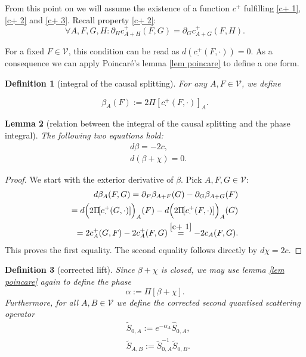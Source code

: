 \documentclass[b5paper,draft,openbib,12pt]{memoir}
\newtheorem{Def}{Definition}
\newtheorem{Lemma}[Def]{Lemma}
\begin{document}
From this point on we will assume the existence of  a function \(c^+\) fulfilling \eqref{c+ 1},\eqref{c+ 2} and \eqref{c+ 3}.
Recall property \eqref{c+ 2}: 
\begin{equation}
\forall A,F,G,H: \partial_H c_{A+H}^+(F,G)=\partial_G c^+_{A+G}(F,H).
\end{equation}

For a fixed \(F\in\mathcal{V}\), this condition can be 
read as \(d( c^+_{\cdot} (F,\cdot))=0\). As a 
consequence we can apply Poincaré's lemma 
\ref{lem poincare} to define a one form.

\begin{Def}[integral of the causal splitting]
For any \(A,F\in\mathcal{V}\), we define

\begin{equation}\label{eq: def beta}
\beta_A(F):=2 \Pi\![c^+_{\cdot}(F,\cdot)]_A.
\end{equation}
\end{Def}

\begin{Lemma}[relation between the integral of the causal splitting and the phase integral]
The following two equations hold:
\begin{align}\label{beta c}
&d \beta=-2 c,\\
&d(\beta +\chi)=0.
\end{align}
\end{Lemma}
\begin{proof}
We start with the exterior derivative of \(\beta\). Pick \(A,F,G\in\mathcal{V}\):
\begin{align}
d\beta_A(F,G)=\partial_F \beta_{A+F}(G)-\partial_G \beta_{A+G}(F)\\
=d\Big(2\Pi\![c^+_\cdot(G,\cdot)]\Big)_A(F)-d\Big(2\Pi\![c^+_\cdot(F,\cdot)]\Big)_A(G)\\
=2 c^+_A(G,F)-2 c_A^+(F,G)\overset{\eqref{c+ 1}}{=}-2 c_A(F,G).
\end{align}
This proves the first equality. The second equality follows directly by \(d \chi=2 c\).
\end{proof}

\begin{Def}[corrected lift]
Since \(\beta+\chi\) is closed, we may use lemma \ref{lem poincare} again to define the phase
\begin{equation}\label{def alpha}
\alpha:=\Pi\![\beta+\chi].
\end{equation}
Furthermore, for all \(A,B\in\mathcal{V}\) we define the corrected second quantised scattering operator 
\begin{align}\label{eq def tilde S}
&\tilde{S}_{0,A}:=e^{-\alpha_A} \hat{S}_{0,A},\\
&\tilde{S}_{A,B}:=\tilde{S}^{-1}_{0,A}\tilde{S}_{0,B}.
\end{align}
\end{Def}
\end{document}
